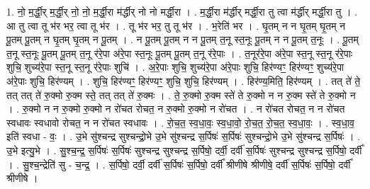 \documentclass[17pt]{extarticle}
\begin{document}
1. नो॒ म॒र्द्धी॒र् म॒र्द्धी॒र् नो॒ नो॒ म॒र्द्धी॒रा म॑र्द्धीर् नो नो मर्द्धी॒रा । . म॒र्द्धी॒रा म॑र्द्धीर् मर्द्धी॒रा तु त्वा म॑र्द्धीर् मर्द्धी॒रा तु । . आ तु त्वा तू भ॑र भर॒ त्वा तू भ॑र । . तू भ॑र भर॒ तु तू भ॑र । . भ॒रेति॑ भर । . घृ॒तम् न न घृ॒तम् घृ॒तम् न पू॒तम् पू॒तम् न घृ॒तम् घृ॒तम् न पू॒तम् । . न पू॒तम् पू॒तम् न न पू॒तम् त॒नू स्त॒नूः पू॒तम् न न पू॒तम् त॒नूः । . पू॒तम् त॒नू स्त॒नूः पू॒तम् पू॒तम् त॒नू र॑रे॒पा अ॑रे॒पा स्त॒नूः पू॒तम् पू॒तम् त॒नू र॑रे॒पाः । . त॒नूर॑रे॒पा अ॑रे॒पा स्त॒नू स्त॒नू र॑रे॒पाः शुचि॒ शुच्य॑रे॒पा स्त॒नू स्त॒नू र॑रे॒पाः शुचि॑ । . अ॒रे॒पाः शुचि॒ शुच्य॑रे॒पा अ॑रे॒पाः शुचि॒ हिर॑ण्यꣳ॒॒ हिर॑ण्यꣳ॒॒ शुच्य॑रे॒पा अ॑रे॒पाः शुचि॒ हिर॑ण्यम् । . शुचि॒ हिर॑ण्यꣳ॒॒ हिर॑ण्यꣳ॒॒ शुचि॒ शुचि॒ हिर॑ण्यम् । . हिर॑ण्य॒मिति॒ हिर॑ण्यम् । . तत् ते॑ ते॒ तत् तत् ते॑ रु॒क्मो रु॒क्म स्ते॒ तत् तत् ते॑ रु॒क्मः । . ते॒ रु॒क्मो रु॒क्म स्ते॑ ते रु॒क्मो न न रु॒क्म स्ते॑ ते रु॒क्मो न । . रु॒क्मो न न रु॒क्मो रु॒क्मो न रो॑चत रोचत॒ न रु॒क्मो रु॒क्मो न रो॑चत । . न रो॑चत रोचत॒ न न रो॑चत स्वधावः स्वधावो रोचत॒ न न रो॑चत स्वधावः । . रो॒च॒त॒ स्व॒धा॒वः॒ स्व॒धा॒वो॒ रो॒च॒त॒ रो॒च॒त॒ स्व॒धा॒वः॒ । . स्व॒धा॒व॒ इति॑ स्वधा - वः॒ । . उ॒भे सु॑श्चन्द्र सुश्चन्द्रो॒भे उ॒भे सु॑श्चन्द्र स॒र्पिषः॑ स॒र्पिषः॑ सुश्चन्द्रो॒भे उ॒भे सु॑श्चन्द्र स॒र्पिषः॑ । . उ॒भे इत्यु॒भे । . सु॒श्च॒न्द्र॒ स॒र्पिषः॑ स॒र्पिषः॑ सुश्चन्द्र सुश्चन्द्र स॒र्पिषो॒ दर्वी॒ दर्वी॑ स॒र्पिषः॑ सुश्चन्द्र सुश्चन्द्र स॒र्पिषो॒ दर्वी᳚ । . सु॒श्च॒न्द्रेति॑ सु - च॒न्द्र॒ । . स॒र्पिषो॒ दर्वी॒ दर्वी॑ स॒र्पिषः॑ स॒र्पिषो॒ दर्वी᳚ श्रीणीषे श्रीणीषे॒ दर्वी॑ स॒र्पिषः॑ स॒र्पिषो॒ दर्वी᳚ श्रीणीषे । \newline
\end{document}
